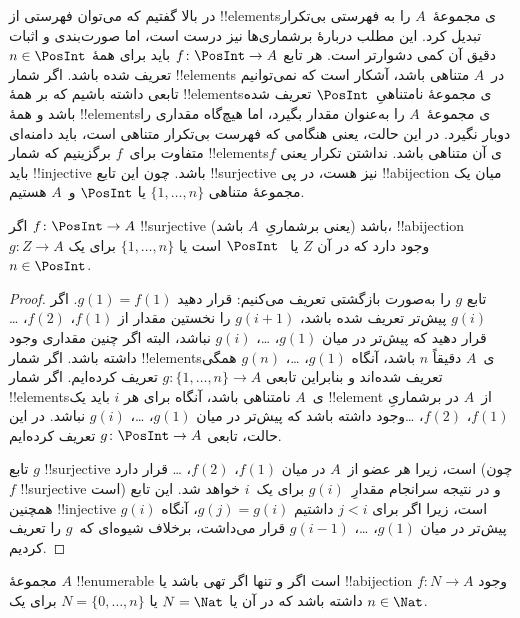 \documentclass[../../../include/open-logic-section]{subfiles}
\begin{document}
در بالا گفتیم که می‌توان فهرستی از !!{element}sی مجموعهٔ~$A$ را به
فهرستی بی‌تکرار تبدیل کرد. این مطلب دربارهٔ برشماری‌ها نیز درست است،
اما صورت‌بندی و اثبات دقیق آن کمی دشوارتر است. هر تابع $f\colon \PosInt \to A$
باید برای همهٔ $n \in
\PosInt$ تعریف شده باشد. اگر شمار !!{element}s در~$A$ متناهی باشد،
آشکار است که نمی‌توانیم تابعی داشته باشیم که بر همهٔ !!{element}sی
مجموعهٔ نامتناهیِ~$\PosInt$ تعریف شده باشد و همهٔ
!!{element}sی مجموعهٔ~$A$ را به‌عنوان مقدار بگیرد، اما هیچ‌گاه مقداری را
دوبار نگیرد. در این حالت، یعنی هنگامی که فهرست بی‌تکرار متناهی است، باید
دامنه‌ای متفاوت برای~$f$ برگزینیم که شمار !!{element}sی آن متناهی باشد.
نداشتن تکرار یعنی $f$ باید !!{injective} باشد. چون این تابع
!!{surjective} نیز هست، در پی !!a{bijection} میان یک مجموعهٔ متناهی
$\{1, \dots, n\}$ یا $\PosInt$ و~$A$ هستیم.

\begin{prop}
اگر $f\colon \PosInt \to A$ !!{surjective} باشد (یعنی برشماریِ~$A$
باشد)، !!a{bijection} $g\colon Z \to A$ وجود دارد که در آن $Z$ یا
~$\PosInt$ است یا $\{1, \dots, n\}$ برای یک~$n \in \PosInt$.
\end{prop}

\begin{proof}
  تابع $g$ را به‌صورت بازگشتی تعریف می‌کنیم: قرار دهید $g(1) = f(1)$.
  اگر $g(i)$ پیش‌تر تعریف شده باشد، $g(i+1)$ را نخستین مقدار از $f(1)$،
  $f(2)$، \dots{} قرار دهید که پیش‌تر در میان $g(1)$، \dots، $g(i)$
  نباشد، البته اگر چنین مقداری وجود داشته باشد. اگر شمار !!{element}sی~$A$
  دقیقاً $n$ باشد، آنگاه $g(1)$، \dots، $g(n)$ همگی تعریف شده‌اند
  و بنابراین تابعی $g\colon \{1, \dots, n\}
  \to A$ تعریف کرده‌ایم. اگر شمار !!{element}sی~$A$ نامتناهی باشد، آنگاه برای هر $i$ باید
  یک !!{element} از~$A$ در برشماریِ $f(1)$، $f(2)$، \dots وجود داشته باشد
  که پیش‌تر در میان $g(1)$، \dots، $g(i)$ نباشد. در این حالت، تابعی
  $g\colon \PosInt \to A$ تعریف کرده‌ایم.

  تابع $g$ !!{surjective} است، زیرا هر عضو از~$A$ در میان $f(1)$،
  $f(2)$، \dots{} قرار دارد (چون $f$ !!{surjective} است) و در نتیجه سرانجام
  مقدارِ~$g(i)$ برای یک~$i$ خواهد شد. این تابع همچنین !!{injective} است،
  زیرا اگر برای $j < i$ داشتیم $g(j) = g(i)$، آنگاه $g(i)$ پیش‌تر
  در میان $g(1)$، \dots، $g(i-1)$ قرار می‌داشت، برخلاف شیوه‌ای که~$g$
  را تعریف کردیم.
\end{proof}

\begin{cor}
مجموعهٔ $A$ !!{enumerable} است اگر و تنها اگر تهی باشد یا !!a{bijection}
$f\colon N \to A$ وجود داشته باشد که در آن یا $N = \Nat$ یا
$N = \{0, \dots, n\}$ برای یک $n \in \Nat$.
\end{cor}
\end{document}
